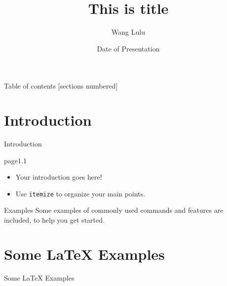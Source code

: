 \documentclass{beamer}
\title[Your Short Title]{This is title}
\author{Wang Lulu}
\institute{Peking University}
\date{Date of Presentation}
\begin{document}
\begin{frame}
  \titlepage
\end{frame}



\begin{frame}{Table of contents}
  [sections numbered]
  \tableofcontents[hideallsubsections]
\end{frame}



\section{Introduction}

\begin{frame}
	\begin{center}
		\item Introduction
	\end{center}
\end{frame}


\begin{frame}{page1.1}

\begin{itemize}
  \item Your introduction goes here!
  \item Use \texttt{itemize} to organize your main points.
\end{itemize}

\vskip 1cm

\begin{block}{Examples}
Some examples of commonly used commands and features are included, to help you get started.
\end{block}

\end{frame}



\section{Some \LaTeX{} Examples}

\begin{frame}
	\begin{center}
		\item Some \LaTeX{} Examples
	\end{center}
\end{frame}
\end{document}
